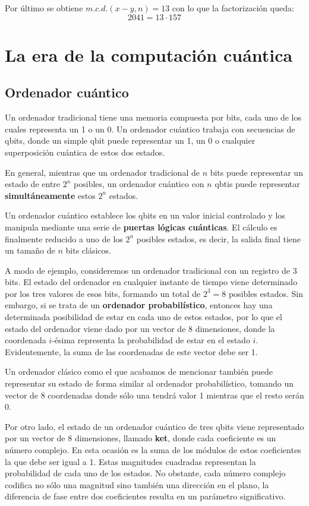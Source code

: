 \documentclass[nochap]{apuntesURJC}
\begin{document}
Por último se obtiene $m.c.d.(x-y,n)=13$ con lo que la factorización queda:
\[2041 = 13 \cdot 157\]


\section{La era de la computación cuántica}
\subsection{Ordenador cuántico}
Un ordenador tradicional tiene una memoria compuesta por bits, cada uno de los cuales representa un 1 o un 0. Un ordenador cuántico trabaja con secuencias de qbits, donde un simple qbit puede representar un 1, un 0 o cualquier superposición cuántica de estos dos estados.

En general, mientras que un ordenador tradicional de $n$ bits puede representar un estado de entre $2^n$ posibles, un ordenador cuántico con $n$ qbtis puede representar \textbf{simultáneamente} estos $2^n$ estados.

Un ordenador cuántico establece los qbits en un valor inicial controlado y los manipula mediante una serie de \textbf{puertas lógicas cuánticas}. El cálculo es finalmente reducido a uno de los $2^n$ posibles estados, es decir, la salida final tiene un tamaño de $n$ bits clásicos.

A modo de ejemplo, consideremos un ordenador tradicional con un registro de 3 bits. El estado del ordenador en cualquier instante de tiempo viene determinado por los tres valores de esos bits, formando un total de $2^3=8$ posibles estados. Sin embargo, si se trata de un \textbf{ordenador probabilístico}, entonces hay una determinada posibilidad de estar en cada uno de estos estados, por lo que el estado del ordenador viene dado por un vector de 8 dimensiones, donde la coordenada $i$-ésima representa la probabilidad de estar en el estado $i$. Evidentemente, la suma de las coordenadas de este vector debe ser 1.

Un ordenador clásico como el que acabamos de mencionar también puede representar su estado de forma similar al ordenador probabilístico, tomando un vector de 8 coordenadas donde sólo una tendrá valor 1 mientras que el resto serán 0.

Por otro lado, el estado de un ordenador cuántico de tres qbits viene representado por un vector de 8 dimensiones, llamado \textbf{ket}, donde cada coeficiente es un número complejo. En esta ocasión es la suma de los módulos de estos coeficientes la que debe ser igual a 1. Estas magnitudes cuadradas representan la probabilidad de cada uno de los estados. No obstante, cada número complejo codifica no sólo una magnitud sino también una dirección en el plano, la diferencia de fase entre dos coeficientes resulta en un parámetro significativo.
\end{document}
